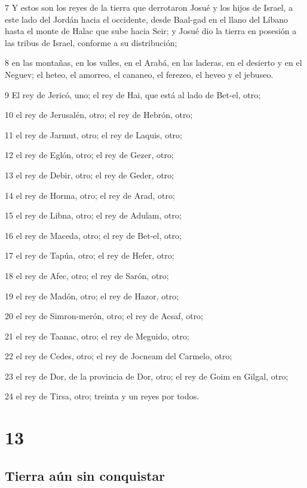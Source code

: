 \par 7 Y estos son los reyes de la tierra que derrotaron Josué y los hijos de Israel, a este lado del Jordán hacia el occidente, desde Baal-gad en el llano del Líbano hasta el monte de Halac que sube hacia Seir; y Josué dio la tierra en posesión a las tribus de Israel, conforme a su distribución;
\par 8 en las montañas, en los valles, en el Arabá, en las laderas, en el desierto y en el Neguev; el heteo, el amorreo, el cananeo, el ferezeo, el heveo y el jebuseo.
\par 9 El rey de Jericó, uno; el rey de Hai, que está al lado de Bet-el, otro;
\par 10 el rey de Jerusalén, otro; el rey de Hebrón, otro;
\par 11 el rey de Jarmut, otro; el rey de Laquis, otro;
\par 12 el rey de Eglón, otro; el rey de Gezer, otro;
\par 13 el rey de Debir, otro; el rey de Geder, otro;
\par 14 el rey de Horma, otro; el rey de Arad, otro;
\par 15 el rey de Libna, otro; el rey de Adulam, otro;
\par 16 el rey de Maceda, otro; el rey de Bet-el, otro;
\par 17 el rey de Tapúa, otro; el rey de Hefer, otro;
\par 18 el rey de Afec, otro; el rey de Sarón, otro;
\par 19 el rey de Madón, otro; el rey de Hazor, otro;
\par 20 el rey de Simron-merón, otro; el rey de Acsaf, otro;
\par 21 el rey de Taanac, otro; el rey de Meguido, otro;
\par 22 el rey de Cedes, otro; el rey de Jocneam del Carmelo, otro;
\par 23 el rey de Dor, de la provincia de Dor, otro; el rey de Goim en Gilgal, otro;
\par 24 el rey de Tirsa, otro; treinta y un reyes por todos.

\chapter{13}

\section*{Tierra aún sin conquistar}

